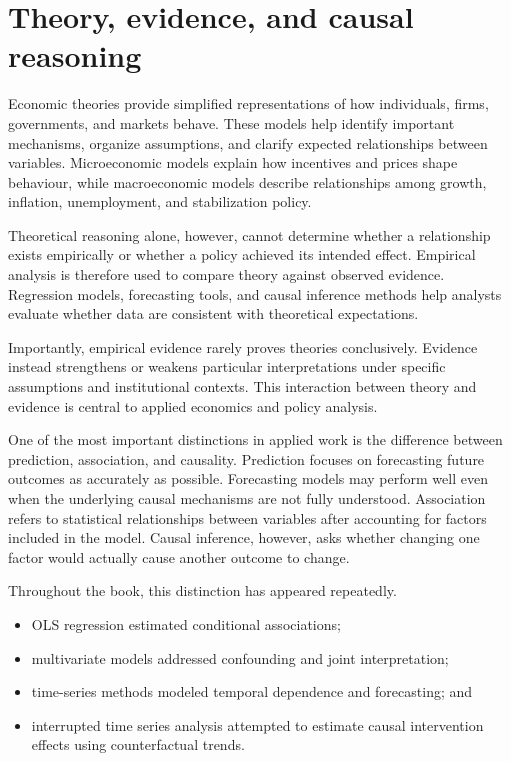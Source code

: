 \documentclass[
  11pt,
  oneside]{book}
\providecommand{\tightlist}{%
  \setlength{\itemsep}{0pt}\setlength{\parskip}{0pt}}
\begin{document}
\section{Theory, evidence, and causal reasoning}\label{theory-evidence-and-causal-reasoning}

Economic theories provide simplified representations of how individuals, firms, governments, and markets behave. These models help identify important mechanisms, organize assumptions, and clarify expected relationships between variables. Microeconomic models explain how incentives and prices shape behaviour, while macroeconomic models describe relationships among growth, inflation, unemployment, and stabilization policy.

Theoretical reasoning alone, however, cannot determine whether a relationship exists empirically or whether a policy achieved its intended effect. Empirical analysis is therefore used to compare theory against observed evidence. Regression models, forecasting tools, and causal inference methods help analysts evaluate whether data are consistent with theoretical expectations.

Importantly, empirical evidence rarely proves theories conclusively. Evidence instead strengthens or weakens particular interpretations under specific assumptions and institutional contexts. This interaction between theory and evidence is central to applied economics and policy analysis.

One of the most important distinctions in applied work is the difference between prediction, association, and causality. Prediction focuses on forecasting future outcomes as accurately as possible. Forecasting models may perform well even when the underlying causal mechanisms are not fully understood. Association refers to statistical relationships between variables after accounting for factors included in the model. Causal inference, however, asks whether changing one factor would actually cause another outcome to change.

Throughout the book, this distinction has appeared repeatedly.

\begin{itemize}
\tightlist
\item
  OLS regression estimated conditional associations;\\
\item
  multivariate models addressed confounding and joint interpretation;\\
\item
  time-series methods modeled temporal dependence and forecasting; and\\
\item
  interrupted time series analysis attempted to estimate causal intervention effects using counterfactual trends.
\end{itemize}
\end{document}
